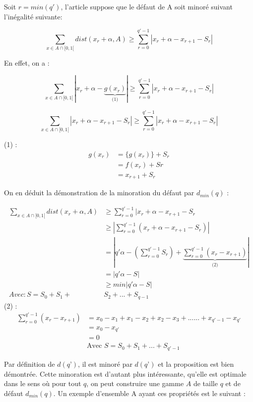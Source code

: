 \documentclass[moyen]{classeUPD}
\begin{document}
Soit $r = min (q')$, l'article suppose que le défaut de A soit minoré suivant l'inégalité suivante:

$$\sum_{x\in A \cap [0,1[}^{} dist(x_{r} + \alpha , A) \ge \sum_{r = 0}^{q' - 1} |x_{r} + \alpha - x_{r+1}- S_{r}|$$

En effet, on a :

$$	\sum_{x\in A \cap [0,1[}^{} |x_{r}+\alpha-\underbrace{g(x_{r})}_\text{(1)}| \ge \sum_{r = 0}^{q' - 1} |x_{r} + \alpha - x_{r+1}- S_{r}|$$

$$ \sum_{x\in A \cap [0,1[}^{} |x_{r}+\alpha-x_{r+1}- S_{r}| \ge \sum_{r = 0}^{q' - 1} |x_{r} + \alpha - x_{r+1}- S_{r}|$$


(1) : \begin{align*}
	g(x_{r}) &= \{g(x_{r})\}+S_{r}\\&=f(x_{r})+Sr\\&=x_{r+1}+S_{r}
\end{align*}

On en déduit la démonstration de la minoration du défaut par $d_{min}(q)$ :

\begin{align*}
	\sum_{x\in A \cap [0,1[}^{} dist(x_{r} + \alpha , A) &\ge \sum_{r = 0}^{q' - 1} |x_{r} + \alpha - x_{r+1}- S_{r}\\ &\ge  \left| \sum_{r = 0}^{q' - 1} (x_{r} + \alpha - x_{r+1}- S_{r})\right| \\& = \left|q'\alpha - \left(\sum_{r = 0}^{q'-1}S_{r}\right)+ \underbrace{\sum_{r = 0}^{q'-1}(x_{r}-x_{r+1})}_\text{(2)}\right| \\& = |q'\alpha-S|\\ &\ge min|q'\alpha-S|\\
	Avec: S = S_{0} + S_{1} +& S_{2} + ...+ S_{q-1}
\end{align*}
(2) : \begin{align*}
\sum_{r = 0}^{q'-1}(x_{r}-x_{r+1}) &= x_{0}-x_{1}+x_{1}-x_{2}+x_{2}-x_{3}+......+x_{q'-1}-x_{q'}\\&=x_{0}-x_{q'}\\&=0\\&\text{Avec } S = S_{0}+S_{1}+...+S_{q'-1}
\end{align*}

Par définition de $d(q’)$, il est minoré par $d(q’)$ et la proposition est bien démontrée. Cette minoration est d'autant plus intéressante, qu'elle est optimale dans le sens où pour tout $q$, on peut construire une gamme $A$ de taille $q$ et de défaut $d_{min}(q)$. Un exemple d'ensemble A ayant ces propriétés est le suivant :
\end{document}
